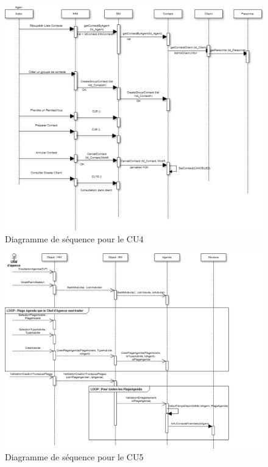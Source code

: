 \begin{figure}[H]
	\begin{center}
		\includegraphics[scale=0.4]{Includes/SOA-Sequence-CU4.png}
		\caption{Diagramme de séquence pour le CU4}
	\end{center}
\end{figure}

\begin{figure}[H]
	\begin{center}
		\includegraphics[scale=0.4]{Includes/SOA-Sequence-CU5.png}
		\caption{Diagramme de séquence pour le CU5}
	\end{center}
\end{figure}



